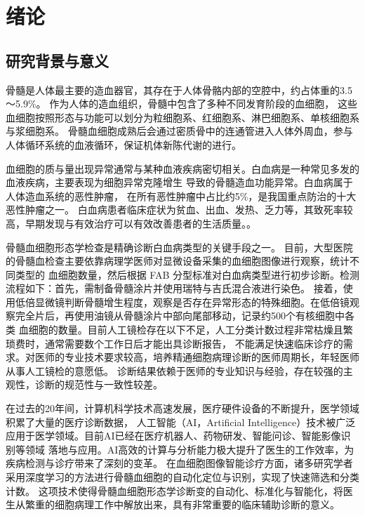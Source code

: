 
\chapter{绪论}
\section{研究背景与意义}
骨髓是人体最主要的造血器官，其存在于人体骨骼内部的空腔中，约占体重的3.5～5.9\%。
作为人体的造血组织，骨髓中包含了多种不同发育阶段的血细胞，
这些血细胞按照形态与功能可以划分为粒细胞系、红细胞系、淋巴细胞系、单核细胞系与浆细胞系。
骨髓血细胞成熟后会通过密质骨中的连通管进入人体外周血，参与人体循环系统的血液循环，保证机体新陈代谢的进行。

血细胞的质与量出现异常通常与某种血液疾病密切相关。白血病\cite{黄治虎2009我国白血病流行病学调查的现状和对策}是一种常见多发的血液疾病，主要表现为细胞异常克隆增生
导致的骨髓造血功能异常。白血病属于人体造血系统的恶性肿瘤，
在所有恶性肿瘤中占比约5\%，是我国重点防治的十大恶性肿瘤之一\cite{SWGC202206005}。
白血病患者临床症状为贫血、出血、发热、乏力等，其致死率较高，早期发现与有效治疗可以有效改善患者的生活质量。\cite{musto2019update,SWGC202206005}。

骨髓血细胞形态学检查是精确诊断白血病类型的关键手段之一\cite{heimpel1979conventional}。
目前，大型医院的骨髓血检查主要依靠病理学医师对显微设备采集的血细胞图像进行观察，统计不同类型的
血细胞数量，然后根据 FAB 分型标准\cite{bennett1976proposals}对白血病类型进行初步诊断\cite{SWGC202206005}。检测流程如下：首先，需制备骨髓涂片并使用瑞特与吉氏混合液进行染色。
接着，使用低倍显微镜判断骨髓增生程度，观察是否存在异常形态的特殊细胞。在低倍镜观察完全片后，再使用油镜从骨髓涂片中部向尾部移动，记录约500个有核细胞中各类
血细胞的数量。目前人工镜检存在以下不足，人工分类计数过程非常枯燥且繁琐费时，通常需要数个工作日后才能出具诊断报告，
不能满足快速临床诊疗的需求。对医师的专业技术要求较高，培养精通细胞病理诊断的医师周期长，年轻医师从事人工镜检的意愿低。
诊断结果依赖于医师的专业知识与经验，存在较强的主观性，诊断的规范性与一致性较差。

在过去的20年间，计算机科学技术高速发展，医疗硬件设备的不断提升，医学领域积累了大量的医疗诊断数据，
人工智能（AI，Artificial Intelligence）技术被广泛应用于医学领域\cite{2018Data,shen2017deep}。目前AI已经在医疗机器人、药物研发、智能问诊、智能影像识别等领域
落地与应用。AI高效的计算与分析能力极大提升了医生的工作效率，为疾病检测与诊疗带来了深刻的变革。
在血细胞图像智能诊疗方面，诸多研究学者采用深度学习的方法进行骨髓血细胞的自动化定位与识别，实现了快速筛选和分类计数。
这项技术使得骨髓血细胞形态学诊断变的自动化、标准化与智能化，将医生从繁重的细胞病理工作中解放出来，具有非常重要的临床辅助诊断的意义\cite{SWGC202206005}。

